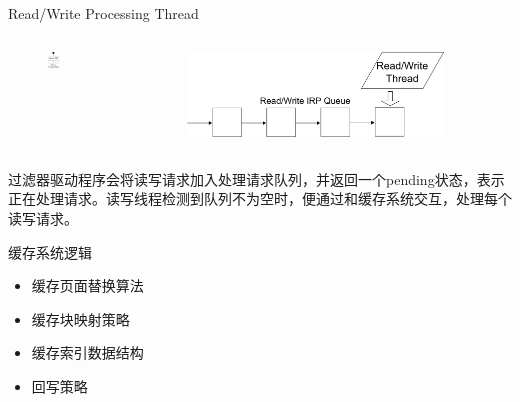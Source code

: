 \documentclass[compress]{beamer}
\begin{document}
\begin{frame}{Read/Write Processing Thread}
    \begin{columns}
    \begin{column}{0.5\textwidth}
        \begin{figure}
        \includegraphics[width=0.3\textwidth]{../graph/df-rw}
        \end{figure}
    \end{column}
    \begin{column}{0.5\textwidth}
        \begin{figure}
        \includegraphics[width=0.9\textwidth]{../graph/df-rw-thread}
        \end{figure}
    \end{column}
    \end{columns}
过滤器驱动程序会将读写请求加入处理请求队列，并返回一个pending状态，表示正在处理请求。读写线程检测到队列不为空时，便通过和缓存系统交互，处理每个读写请求。
\end{frame}

\begin{frame}{缓存系统逻辑}
\begin{itemize}
\item 缓存页面替换算法
\item 缓存块映射策略
\item 缓存索引数据结构
\item 回写策略
\end{itemize}
\end{frame}
\end{document}
